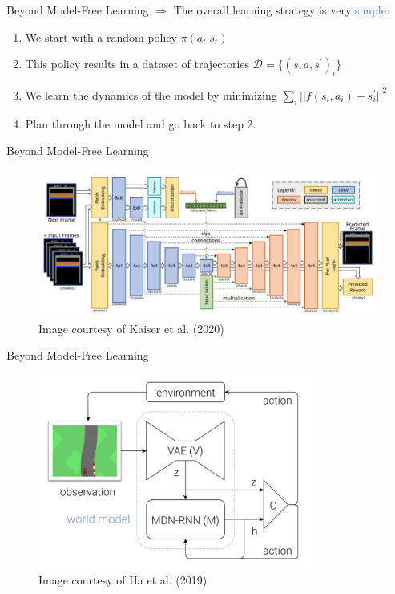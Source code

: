 \documentclass{beamer}
\begin{document}
\begin{frame}{Beyond Model-Free Learning}
	$\Rightarrow$ The overall learning strategy is very \textcolor{RoyalBlue}{simple}:
	
	\bigskip

	\begin{enumerate}
		\item We start with a random policy $\pi(a_t|s_t)$
		\item This policy results in a dataset of trajectories $\mathcal{D}=\{(s, a, s^{\prime})_i\}$
		\item We learn the dynamics of the model by minimizing $\sum_i ||f(s_i, a_i) - s_i^{\prime}||^{2}$
		\item Plan through the model and go back to step 2.
	\end{enumerate}

\end{frame}

\begin{frame}{Beyond Model-Free Learning}
	\begin{center}
		\begin{figure}
			\includegraphics[width=\textwidth]{./Images/model_architecture}
			\caption{Image courtesy of Kaiser et al. (2020)}
			\end{figure}
	\end{center}
\end{frame}

\begin{frame}{Beyond Model-Free Learning}
	\begin{center}
		\begin{figure}
			\includegraphics[width=9cm]{./Images/world_models}
			\caption{Image courtesy of Ha et al. (2019)}
			\end{figure}
	\end{center}
\end{frame}
\end{document}
